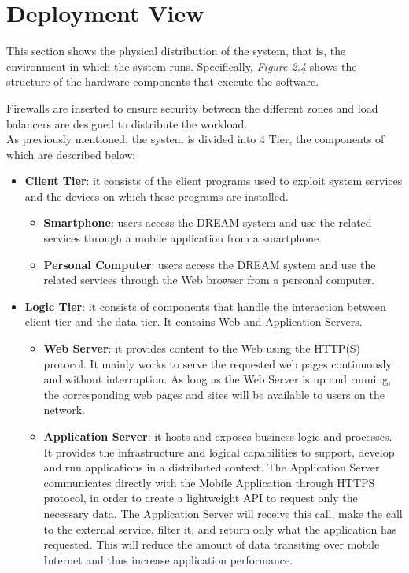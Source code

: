 \section{Deployment View}
This section shows the physical distribution of the system, that is, the environment in which the system runs. Specifically, \textit{Figure 2.4} shows the structure of the hardware components that execute the software.

Firewalls are inserted to ensure security between the different zones and load balancers are designed to distribute the workload.\\

As previously mentioned, the system is divided into 4 Tier, the components of which are described below:
\begin{itemize}
    \item \textbf{Client Tier}: it consists of the client programs used to exploit system services and the devices on which these programs are installed.
    \begin{itemize}
        \item \textbf{Smartphone}: users access the DREAM system and use the related services through a mobile application from a smartphone.
        \item \textbf{Personal Computer}: users access the DREAM system and use the related services through the Web browser from a personal computer.
    \end{itemize}
    \item \textbf{Logic Tier}: it consists of components that handle the interaction between client tier and the data tier.  It contains Web and Application Servers.
    \begin{itemize}
        \item \textbf{Web Server}: it provides content to the Web using the HTTP(S) protocol. It mainly works to serve the requested web pages continuously and without interruption. As long as the Web Server is up and running, the corresponding web pages and sites will be available to users on the network.
        \item \textbf{Application Server}: it hosts and exposes business logic and processes. It provides the infrastructure and logical capabilities to support, develop and run applications in a distributed context. The Application Server communicates directly with the Mobile Application through HTTPS protocol, in order to create a lightweight API to request only the necessary data. The Application Server will receive this call, make the call to the external service, filter it, and return only what the application has requested.  This will reduce the amount of data transiting over mobile Internet and thus increase application performance.

\end{itemize}
\end{itemize}
